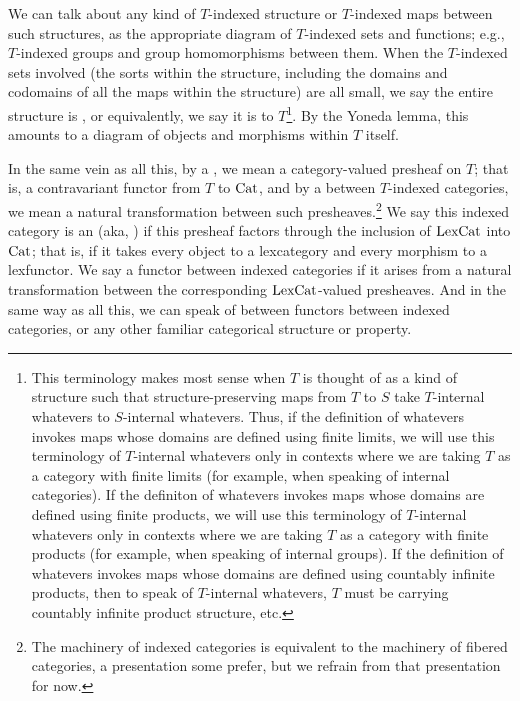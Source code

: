 We can talk about any kind of $T$-indexed structure or $T$-indexed maps between such structures, as the appropriate diagram of $T$-indexed sets and functions; e.g., $T$-indexed groups and group homomorphisms between them. When the $T$-indexed sets involved (the sorts within the structure, including the domains and codomains of all the maps within the structure) are all small, we say the entire structure is , or equivalently, we say it is  to $T$\footnote{This  terminology makes most sense when $T$ is thought of as a kind of structure such that structure-preserving maps from $T$ to $S$ take $T$-internal whatevers to $S$-internal whatevers. Thus, if the definition of whatevers invokes maps whose domains are defined using finite limits, we will use this terminology of $T$-internal whatevers only in contexts where we are taking $T$ as a category with finite limits (for example, when speaking of internal categories). If the definiton of whatevers invokes maps whose domains are defined using finite products, we will use this terminology of $T$-internal whatevers only in contexts where we are taking $T$ as a category with finite products (for example, when speaking of internal groups). If the definition of whatevers invokes maps whose domains are defined using countably infinite products, then to speak of $T$-internal whatevers, $T$ must be carrying countably infinite product structure, etc.}. By the Yoneda lemma, this amounts to a diagram of objects and morphisms within $T$ itself.

In the same vein as all this, by a , we mean a category-valued presheaf on $T$; that is, a contravariant functor from $T$ to $\mathrm{Cat}$, and by a  between $T$-indexed categories, we mean a natural transformation between such presheaves.\footnote{The machinery of indexed categories is equivalent to the machinery of fibered categories, a presentation some prefer, but we refrain from that presentation for now.} We say this indexed category is an  (aka, ) if this presheaf factors through the inclusion of $\mathrm{LexCat}$ into $\mathrm{Cat}$; that is, if it takes every object to a lexcategory and every morphism to a lexfunctor. We say a functor between indexed categories  if it arises from a natural transformation between the corresponding $\mathrm{LexCat}$-valued presheaves. And in the same way as all this, we can speak of  between functors between indexed categories, or any other familiar categorical structure or property.

